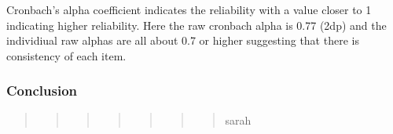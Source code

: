\documentclass[
]{article}
\begin{document}
Cronbach's alpha coefficient indicates the reliability with a value
closer to 1 indicating higher reliability. Here the raw cronbach alpha
is 0.77 (2dp) and the individiual raw alphas are all about 0.7 or higher
suggesting that there is consistency of each item.

\hypertarget{conclusion}{%
\subsubsection{Conclusion}\label{conclusion}}

\begin{quote}
\begin{quote}
\begin{quote}
\begin{quote}
\begin{quote}
\begin{quote}
\begin{quote}
sarah
\end{quote}
\end{quote}
\end{quote}
\end{quote}
\end{quote}
\end{quote}
\end{quote}
\end{document}
